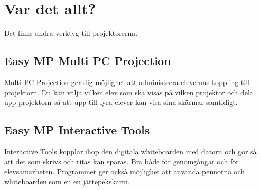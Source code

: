 \documentclass[11pt]{article}
\begin{document}
\section{Var det allt?}
    Det finns andra verktyg till projektorerna.
    \subsection{Easy MP Multi PC Projection }
        Multi PC Projection ger dig möjlighet att administrera elevernas koppling till projektorn.
        Du kan välja vilken elev som ska visas på vilken projektor och dela upp projektorn så att upp till fyra elever kan visa sina skärmar samtidigt.
    \subsection{Easy MP Interactive Tools}
        Interactive Tools kopplar ihop den digitala whiteboarden med datorn och gör så att det som skrivs och ritas kan sparas.
        Bra både för genomgångar och för elevsamarbeten. Programmet ger också möjlighet att använda pennorna och whiteboarden som en
        en jättepekskärm.
\end{document}
